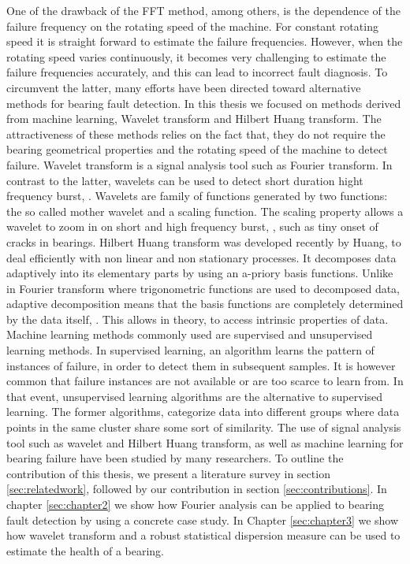 \documentclass[../Main/thesis.tex]{subfiles}
\begin{document}
\justify
One of the drawback of the FFT method, among others, is the dependence of the failure frequency on the rotating speed of the machine. For constant rotating speed it is straight forward to estimate the failure frequencies. However, when the rotating speed varies continuously, it becomes very challenging to estimate the failure frequencies accurately, and this can lead to incorrect fault diagnosis.
\justify
To circumvent the latter, many efforts have been directed toward alternative methods for bearing fault detection. In this thesis we focused on methods derived from machine learning, Wavelet transform and Hilbert Huang transform. The attractiveness of these methods relies on the fact that, they do not require the bearing geometrical properties and the rotating speed of the machine to detect failure. 
\justify
Wavelet transform is a signal analysis tool such as Fourier transform. In contrast to the latter, wavelets can be used to detect short duration hight frequency burst, \cite{albert09}.
Wavelets are family of functions generated by two functions: the so called mother wavelet and a scaling function. The scaling property allows a wavelet to zoom in on short and high frequency burst, \cite{albert09},
such as tiny onset of cracks in bearings.
\justify
Hilbert Huang transform was developed recently by  Huang, \cite{huang98} to deal efficiently with non linear and non stationary processes. It decomposes data adaptively 
into its elementary parts by using an a-priory basis functions. Unlike in Fourier transform where trigonometric functions are used to decomposed data, adaptive decomposition means that 
the basis functions are completely determined by the data itself, \cite{huang08}. This allows in theory, to access intrinsic properties of data.
\justify
Machine learning methods commonly used are supervised and unsupervised learning methods. In supervised learning, an algorithm learns the pattern of instances of failure, in order to detect them in subsequent samples. It is however common that failure instances are not available or are too scarce to learn from. In that event, unsupervised learning algorithms are the alternative to supervised learning. The former algorithms, categorize data into different groups where data points in the same cluster share some sort of similarity.
\justify
The use of signal analysis tool such as wavelet and Hilbert Huang transform, as well as machine learning for bearing failure have been studied by many researchers. To outline the contribution of this thesis, we present a literature survey in section \ref{sec:relatedwork}, followed by our contribution in section \ref{sec:contributions}. In chapter \ref{sec:chapter2} we show how Fourier analysis can be applied to bearing fault detection by using a concrete case study. In Chapter \ref{sec:chapter3} we show how wavelet transform and a robust statistical dispersion measure can be used to estimate the health of a bearing.
\end{document}
